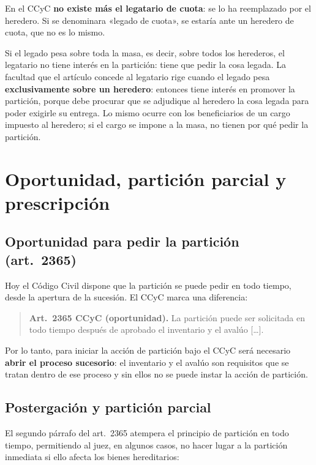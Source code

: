 \documentclass[12pt,oneside]{book}
\begin{document}
\begin{important}
En el CCyC \textbf{no existe más el legatario de cuota}: se lo ha reemplazado por el heredero. Si se denominara «legado de cuota», se estaría ante un heredero de cuota, que no es lo mismo.
\end{important}

Si el legado pesa sobre toda la masa, es decir, sobre todos los herederos, el legatario no tiene interés en la partición: tiene que pedir la cosa legada. La facultad que el artículo concede al legatario rige cuando el legado pesa \textbf{exclusivamente sobre un heredero}: entonces tiene interés en promover la partición, porque debe procurar que se adjudique al heredero la cosa legada para poder exigirle su entrega. Lo mismo ocurre con los beneficiarios de un cargo impuesto al heredero; si el cargo se impone a la masa, no tienen por qué pedir la partición.

\section{Oportunidad, partición parcial y prescripción}

\subsection{Oportunidad para pedir la partición (art.~2365)}

Hoy el Código Civil dispone que la partición se puede pedir en todo tiempo, desde la apertura de la sucesión. El CCyC marca una diferencia:

\begin{quote}
\textbf{Art.~2365 CCyC (oportunidad).} La partición puede ser solicitada en todo tiempo después de aprobado el inventario y el avalúo [\ldots].
\end{quote}

Por lo tanto, para iniciar la acción de partición bajo el CCyC será necesario \textbf{abrir el proceso sucesorio}: el inventario y el avalúo son requisitos que se tratan dentro de ese proceso y sin ellos no se puede instar la acción de partición.

\subsection{Postergación y partición parcial}

El segundo párrafo del art.~2365 atempera el principio de partición en todo tiempo, permitiendo al juez, en algunos casos, no hacer lugar a la partición inmediata si ello afecta los bienes hereditarios:
\end{document}
